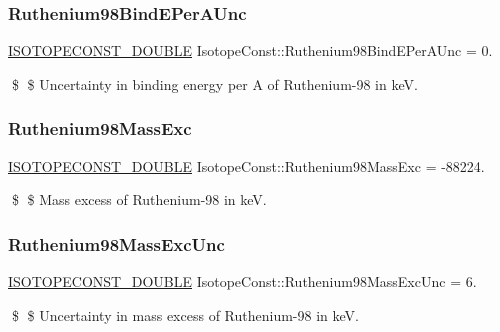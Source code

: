 \subsubsection{\texorpdfstring{Ruthenium98\+Bind\+E\+Per\+A\+Unc}{Ruthenium98BindEPerAUnc}}
{\footnotesize\ttfamily \mbox{\hyperlink{group___isotope_const-_macros_ga8f45a7272ce02c0b4c65c44636ed719a}{I\+S\+O\+T\+O\+P\+E\+C\+O\+N\+S\+T\+\_\+\+D\+O\+U\+B\+LE}} Isotope\+Const\+::\+Ruthenium98\+Bind\+E\+Per\+A\+Unc = 0.}

\$ \$ Uncertainty in binding energy per A of Ruthenium-\/98 in keV. \mbox{\label{group___isotope_const-_ruthenium-_ru98_ga9343c9136adb914af1064c14c2bf255f}} 
\subsubsection{\texorpdfstring{Ruthenium98\+Mass\+Exc}{Ruthenium98MassExc}}
{\footnotesize\ttfamily \mbox{\hyperlink{group___isotope_const-_macros_ga8f45a7272ce02c0b4c65c44636ed719a}{I\+S\+O\+T\+O\+P\+E\+C\+O\+N\+S\+T\+\_\+\+D\+O\+U\+B\+LE}} Isotope\+Const\+::\+Ruthenium98\+Mass\+Exc = -\/88224.}

\$ \$ Mass excess of Ruthenium-\/98 in keV. \mbox{\label{group___isotope_const-_ruthenium-_ru98_gabc6b2381423e5d47122fa626157cffe9}} 
\subsubsection{\texorpdfstring{Ruthenium98\+Mass\+Exc\+Unc}{Ruthenium98MassExcUnc}}
{\footnotesize\ttfamily \mbox{\hyperlink{group___isotope_const-_macros_ga8f45a7272ce02c0b4c65c44636ed719a}{I\+S\+O\+T\+O\+P\+E\+C\+O\+N\+S\+T\+\_\+\+D\+O\+U\+B\+LE}} Isotope\+Const\+::\+Ruthenium98\+Mass\+Exc\+Unc = 6.}

\$ \$ Uncertainty in mass excess of Ruthenium-\/98 in keV. \mbox{\label{group___isotope_const-_ruthenium-_ru98_gafe57a6fe207787b1036d897f7efecef5}} 
